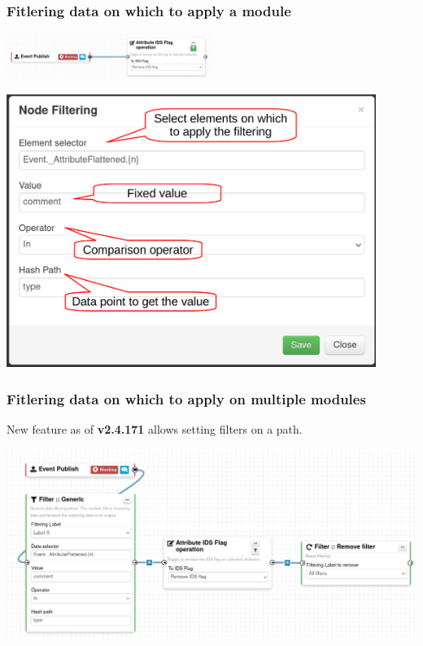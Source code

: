 \begin{frame}
    \frametitle{Fitlering data on which to apply a module}
    \begin{center}
        \includegraphics[width=0.5\textwidth]{pictures/remove-ids-3.png}
    \end{center}
    \begin{center}
        \includegraphics[width=0.9\textwidth]{pictures/remove-ids-2-details.png}
    \end{center}
\end{frame}

\begin{frame}
    \frametitle{Fitlering data on which to apply on multiple modules}
    New feature as of \textbf{v2.4.171} allows setting filters on a path.
    \begin{center}
        \includegraphics[width=1.0\textwidth]{pictures/remove-ids-generic.png}
    \end{center}
\end{frame}

